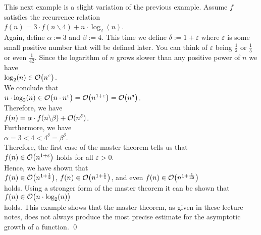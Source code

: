 \example
This next example is a slight variation of the previous example.  Assume $f$ satisfies the recurrence relation 
\\[0.2cm]
\hspace*{1.3cm}
$f(n) = 3 \cdot f(n \backslash 4) + n \cdot \log_2(n)$.
\\[0.2cm]
Again, define $\alpha := 3$ and $\beta := 4$.  This time we define $\delta := 1 + \varepsilon$ where
$\varepsilon$ is some small positive number that will be defined later.  You can think of $\varepsilon$ being $\frac{1}{2}$ or
$\frac{1}{5}$ or even $\frac{1}{42}$.  Since the logarithm of $n$
grows slower than any positive power of $n$ we have
\\[0.2cm]
\hspace*{1.3cm}
$\log_2(n) \in \mathcal{O}\bigl(n^\varepsilon\bigr)$.
\\[0.2cm]
We conclude that
\\[0.2cm]
\hspace*{1.3cm}
$n \cdot \log_2(n) \in \mathcal{O}\bigl(n \cdot n^\varepsilon\bigr) = \mathcal{O}\bigl(n^{1+\varepsilon}\bigr) = \mathcal{O}\bigl(n^\delta\bigr)$.
\\[0.2cm]
Therefore, we have
\\[0.2cm]
\hspace*{1.3cm}
$f(n) = \alpha \cdot f(n \backslash \beta) + \mathcal{O}(n^\delta)$.
\\[0.2cm]
Furthermore, we have
\\[0.2cm]
\hspace*{1.3cm}
$\alpha = 3 < 4 < 4^\delta = \beta^\delta$.
\\[0.2cm]
Therefore, the first case of the master theorem tells us that
\\[0.2cm]
\hspace*{1.3cm}
$f(n) \in \mathcal{O}\bigl(n^{1+\varepsilon}\bigr)$ \quad holds for all $\varepsilon > 0$.
\\[0.2cm]
Hence, we have shown that
\\[0.2cm]
\hspace*{1.3cm}
$f(n) \in \mathcal{O}\bigl(n^{1+\frac{1}{2}}\bigr)$, \quad
$f(n) \in \mathcal{O}\bigl(n^{1+\frac{1}{5}}\bigr)$, \quad and even \quad
$f(n) \in \mathcal{O}\bigl(n^{1+\frac{1}{42}}\bigr)$
\\[0.2cm]
holds.  Using a stronger form of the master theorem it can be shown that
\\[0.2cm]
\hspace*{1.3cm}
$f(n) \in \mathcal{O}\bigl(n \cdot \log_2(n)\bigr)$
\\[0.2cm]
holds.  This example shows that the master theorem, as given in these lecture notes, does not always
produce the most precise estimate for the asymptotic growth of a function.
\qed



